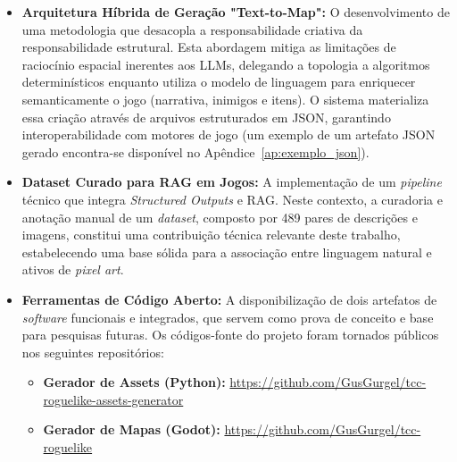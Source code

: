 \begin{itemize}
    \item \textbf{Arquitetura Híbrida de Geração "Text-to-Map":} O
          desenvolvimento de uma metodologia que desacopla a responsabilidade criativa
          da responsabilidade estrutural. Esta abordagem mitiga as limitações de
          raciocínio espacial inerentes aos \gls{LLM}s, delegando a topologia a
          algoritmos determinísticos enquanto utiliza o modelo de linguagem para
          enriquecer semanticamente o jogo (narrativa, inimigos e itens). O sistema
          materializa essa criação através de arquivos estruturados em \gls{JSON},
          garantindo interoperabilidade com motores de jogo (um exemplo de um artefato
          JSON gerado encontra-se disponível no Apêndice~\ref{ap:exemplo_json}).

    \item \textbf{Dataset Curado para RAG em Jogos:} A implementação de um
          \textit{pipeline} técnico que integra \textit{Structured Outputs} e
          \gls{RAG}. Neste contexto, a curadoria e anotação manual de um
          \textit{dataset}, composto por 489 pares de descrições e imagens, constitui
          uma contribuição técnica relevante deste trabalho, estabelecendo uma base
          sólida para a associação entre linguagem natural e ativos de \textit{pixel
              art}.

    \item \textbf{Ferramentas de Código Aberto:} A disponibilização de dois
          artefatos de \textit{software} funcionais e integrados, que servem como
          prova de conceito e base para pesquisas futuras. Os códigos-fonte do projeto
          foram tornados públicos nos seguintes repositórios:
          \begin{itemize}
              \item \textbf{Gerador de Assets (Python):} \url{https://github.com/GusGurgel/tcc-roguelike-assets-generator}
              \item \textbf{Gerador de Mapas (Godot):} \url{https://github.com/GusGurgel/tcc-roguelike}
          \end{itemize}
\end{itemize}